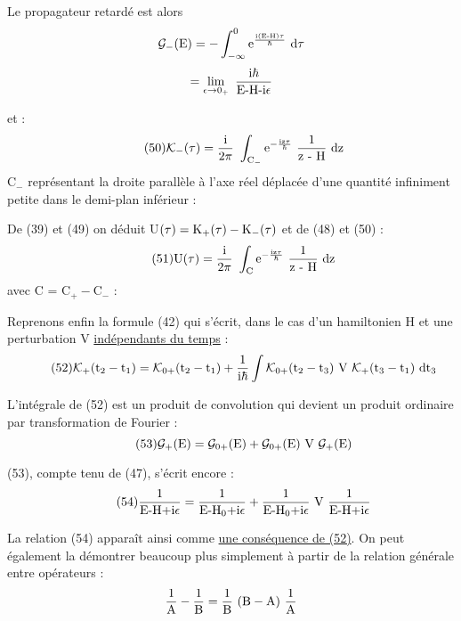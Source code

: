 Le propagateur retardé est alors
\[
\mathcal{G}_-(\text{E})=-\int_{-\infty}^0 \text{e}^{\frac{\text{i(E-H)}\tau}{\hbar}}\ \text{d}\tau
\]
\[
=\lim_{\epsilon\to 0_+}\ \frac{\mt{i}\hbar}{\mt{E-H-i}\epsilon}
\]

et :
\[
\tag{50}\mc{K}_-(\tau)=\frac{\mt{i}}{2\pi}\ \int_{\mt{C}_-}\mt{e}^{-\frac{\mt{iz}\tau}{\hbar}}\ \frac{1}{\mt{z - H}}\ \mt{dz}
\]
C$_-$ représentant la droite parallèle à l'axe réel déplacée d'une quantité
infiniment petite dans le demi-plan inférieur :\begin{center}
 \end{center}

De (39) et (49) on déduit U$(\tau)=\text{K}_+(\tau)-\text{K}_-(\tau)$
et de (48) et (50) :
\[
\tag{51}\mt{U}(\tau)=\frac{\mt{i}}{2\pi}\ \int_\mt{C}\mt{e}^{-\frac{\mt{iz}\tau}{\hbar}}\ \frac{1}{\mt{z - H}}\ \mt{dz}
\]
avec C = C$_+-$C$_-$ :\begin{center}
 \end{center}

Reprenons enfin la formule (42) qui s'écrit, dans le cas d'un
hamiltonien H et une perturbation V \ul{indépendants du temps} :
\[
\tag{52}\mc{K}_+(\mt{t}_2-\mt{t}_1)=\mc{K}_{0+}(\mt{t}_2-\mt{t}_1) + \frac{1}{\mt{i}\hbar}\int
\mc{K}_{0+}(\mt{t}_2-\mt{t}_3)\ \mt{V}\ \mc{K}_+(\mt{t}_3-\mt{t}_1)\ \mt{dt}_3
\]

L'intégrale de (52) est un produit de convolution qui devient un produit
ordinaire par transformation de Fourier :
\[
\tag{53}\mc{G}_+(\mt{E})=\mc{G}_{0+}(\mt{E})+\mc{G}_{0+}(\mt{E})\ \mt{V}\ \mc{G}_+(\mt{E})
\]

(53), compte tenu de (47), s'écrit encore :
\[
\tag{54}\frac{1}{\mt{E-H+i}\epsilon}=\frac{1}{\mt{E-H}_0\mt{+i}\epsilon}+\frac{1}{\mt{E-H}_0\mt{+i}\epsilon}\ \mt{V}\ \frac{1}{\mt{E-H+i}\epsilon}
\]

La relation (54) apparaît ainsi comme \ul{une conséquence de (52)}. On peut
également la démontrer beaucoup plus simplement à partir de la relation
générale entre opérateurs :
\[
\frac{1}{\mt{A}}-\frac{1}{\mt{B}}=\frac{1}{\mt{B}}\ (\mt{B}-\mt{A})\ \frac{1}{\mt{A}}
\]
